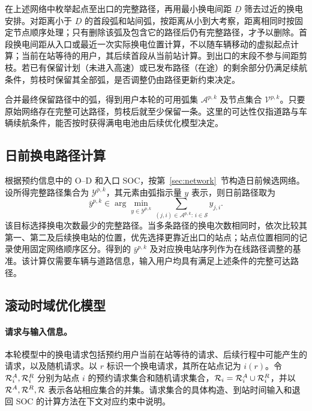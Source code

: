 在上述网络中枚举起点至出口的完整路径，再用最小换电间距 $\underline D$ 筛去过近的换电安排。对距离小于 $\underline D$ 的首段弧和站间弧，按距离从小到大考察，距离相同时按固定节点顺序处理；只有删除该弧及包含它的路径后仍有完整路径，才予以删除。首段换电间距从入口或最近一次实际换电位置计算，不以随车辆移动的虚拟起点计算；当前在站等待的用户，其后续首段从当前站计算。到出口的末段不参与间距剪枝。若已有保留计划（未进入高速）或已发布路径（在途）的剩余部分仍满足续航条件，剪枝时保留其全部弧，是否调整仍由路径更新约束决定。

合并最终保留路径中的弧，得到用户本轮的可用弧集 $\mathcal A^{p,k}$ 及节点集合 $\mathcal V^{p,k}$。只要原始网络存在完整可达路径，剪枝后就至少保留一条。这里的可达性仅指道路与车辆续航条件，能否按时获得满电电池由后续优化模型决定。

\subsection{日前换电路径计算}
\label{sec:dayahead}
根据预约信息中的 O--D 和入口 SOC，按第~\ref{sec:network}~节构造日前候选网络。设所得完整路径集合为 $\mathcal Y^{p,k}$，其元素由弧指示量 $y$ 表示，则日前路径取为
\begin{equation}
\bar y^{p,k}\in\arg\min_{y\in\mathcal Y^{p,k}}
\sum_{(j,i)\in\mathcal A^{p,k}:\,i\in\mathcal S}y_{j,i}.
\label{eq:dayahead_path}
\end{equation}
该目标选择换电次数最少的完整路径。当多条路径的换电次数相同时，依次比较其第一、第二及后续换电站的位置，优先选择更靠近出口的站点；站点位置相同的记录使用固定网络顺序区分。得到的 $\bar y^{p,k}$ 及对应换电站序列作为在线路径调整的基准。该计算仅需要车辆与道路信息，输入用户均具有满足上述条件的完整可达路径。

\subsection{滚动时域优化模型}
\label{sec:model}

\paragraph{请求与输入信息。}
本轮模型中的换电请求包括预约用户当前在站等待的请求、后续行程中可能产生的请求，以及随机请求。以 $r$ 标识一个换电请求，其所在站点记为 $i(r)$。令 $\mathcal R_i^A,\mathcal R_i^R$ 分别为站点 $i$ 的预约请求集合和随机请求集合，$\mathcal R_i=\mathcal R_i^A\cup\mathcal R_i^R$，并以 $\mathcal R^A,\mathcal R^R,\mathcal R$ 表示各站相应集合的并集。请求集合的具体构造、到站时间输入和退回 SOC 的计算方法在下文对应约束中说明。

